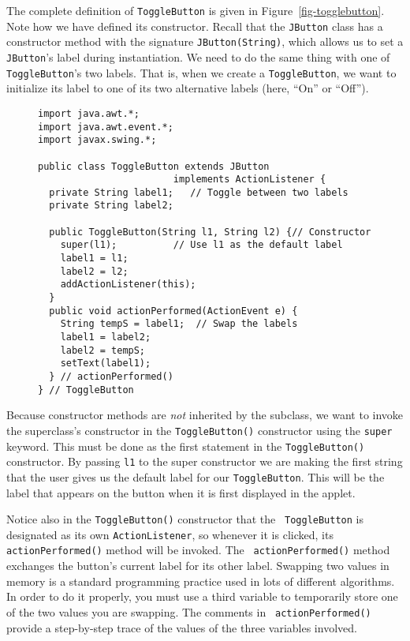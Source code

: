 The complete definition of {\tt ToggleButton} is given in
Figure~\ref{fig-togglebutton}. Note how we have defined its
constructor. Recall that the {\tt JButton} class has a constructor
method with the signature {\tt JButton(String)}, which allows us to
set a {\tt JButton}'s label during instantiation.  We need to do the
same thing with one of {\tt ToggleButton}'s two labels.  That is, when
we create a {\tt ToggleButton}, we want to initialize its label to one
of its two alternative labels (here, ``On'' or ``Off'').

\begin{figure}[b!]
\jjjprogstart
\begin{jjjlisting}
\begin{lstlisting}
import java.awt.*;
import java.awt.event.*;
import javax.swing.*;

public class ToggleButton extends JButton 
                        implements ActionListener {   
  private String label1;   // Toggle between two labels
  private String label2;
   
  public ToggleButton(String l1, String l2) {// Constructor
    super(l1);          // Use l1 as the default label
    label1 = l1; 
    label2 = l2;
    addActionListener(this);
  } 
  public void actionPerformed(ActionEvent e) {
    String tempS = label1;  // Swap the labels
    label1 = label2;
    label2 = tempS;
    setText(label1);
  } // actionPerformed()
} // ToggleButton
\end{lstlisting}
\end{jjjlisting}
\end{figure}

Because constructor methods are {\it not} inherited by the subclass,
we want to invoke the superclass's constructor in the {\tt ToggleButton()}
constructor using the {\tt super} keyword. This must be done as the
first statement in the {\tt ToggleButton()} constructor.
By passing {\tt l1} to the super constructor we are making the first string
that the user gives us the default label for our {\tt ToggleButton}.
This will be the label that appears on the button when it is first
displayed in the applet.

Notice also in the {\tt ToggleButton()} constructor that the {\tt
ToggleButton} is designated as its own {\tt ActionListener}, so
whenever it is clicked, its
{\tt actionPerformed()} method will be invoked. The {\tt
actionPerformed()} method exchanges the button's current label for its
other label.  Swapping two values in memory is a standard programming
practice used in lots of different algorithms.  In order to do it
properly, you must use a third variable to temporarily store one of
the two values you are swapping. The comments in {\tt
actionPerformed()} provide a step-by-step trace of the values of the
three variables involved.

